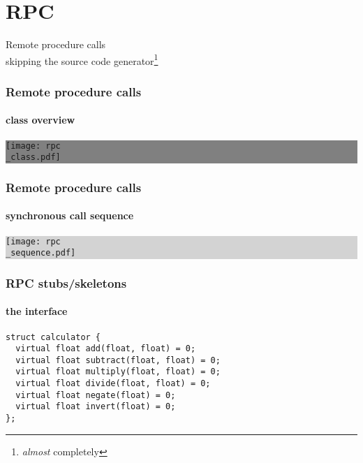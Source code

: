 \documentclass[compress,table,xcolor=table]{beamer}
\begin{document}
\section{RPC}
\begin{frame}[c]
  \Huge
  \centering
  Remote procedure calls\\
  \Large
  skipping the source code generator\footnote{{\em almost} completely}
\end{frame}
\begin{frame}
  \frametitle{Remote procedure calls}
  \framesubtitle{class overview}
  \colorbox{gray}{
    \begin{minipage}{\dimexpr\textwidth\relax}
    \centering
    \texttt{[image: rpc\\\_class.pdf]}
    \end{minipage}
  }
\end{frame}
\begin{frame}
  \frametitle{Remote procedure calls}
  \framesubtitle{synchronous call sequence}
  \colorbox{lightgray}{
    \begin{minipage}{\dimexpr\textwidth\relax}
    \centering
    \texttt{[image: rpc\\\_sequence.pdf]}
    \end{minipage}
  }
\end{frame}
\begin{frame}[fragile]
  \frametitle{RPC stubs/skeletons}
  \framesubtitle{the interface}
  \begin{lstlisting}[language=c++2x,basicstyle=\normalsize\ttfamily]
struct calculator {
  virtual float add(float, float) = 0;
  virtual float subtract(float, float) = 0;
  virtual float multiply(float, float) = 0;
  virtual float divide(float, float) = 0;
  virtual float negate(float) = 0;
  virtual float invert(float) = 0;
};
  \end{lstlisting}
\end{frame}
\end{document}

